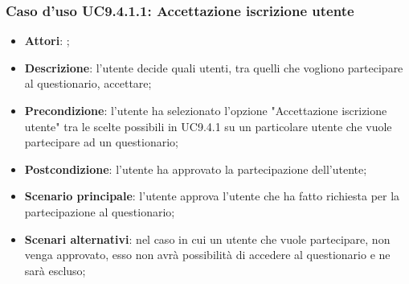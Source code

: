 			 \subsubsection{Caso d'uso UC9.4.1.1: Accettazione iscrizione utente}
			 \label{UC9.4.1.1}
			 \begin{itemize}
			 	\item \textbf{Attori}: \uaupro;
			 	\item \textbf{Descrizione}: l'utente decide quali utenti, tra quelli che vogliono partecipare al questionario, accettare; 
			 	\item \textbf{Precondizione}: l'utente ha selezionato l'opzione "Accettazione iscrizione utente" tra le scelte possibili in UC9.4.1 su un particolare utente che vuole partecipare ad un questionario;
			 	\item \textbf{Postcondizione}: l'utente ha approvato la partecipazione dell'utente;
			 	\item \textbf{Scenario principale}: l'utente approva l'utente che ha fatto richiesta per la partecipazione al questionario; 
			 	\item \textbf{Scenari alternativi}: nel caso in cui un utente che vuole partecipare, non venga approvato, esso non avrà possibilità di accedere al questionario e ne sarà escluso;
			 \end{itemize}
			
				